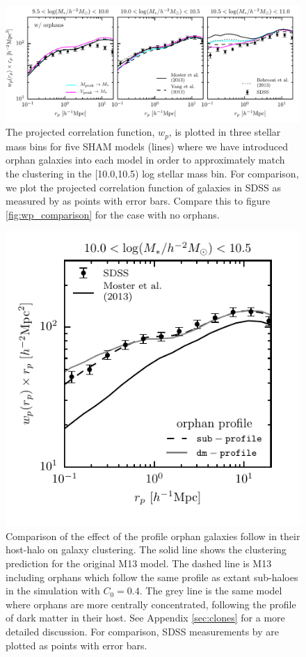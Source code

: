 \documentclass[a4paper,fleqn,usenatbib]{mnras}
\begin{document}
\begin{figure}
    \includegraphics{figures/wp_comparison_w_orphans.pdf}
    \caption{The projected correlation function, $w_p$, is plotted in three stellar mass bins for five SHAM models (lines) where we have introduced orphan galaxies into each model in order to approximately match the clustering in the [10.0,10.5) log stellar mass bin.  For comparison, we plot the projected correlation function of galaxies in SDSS as measured by \citet{Yang:2012ew} as points with error bars.  Compare this to figure \ref{fig:wp_comparison} for the case with no orphans.  }
    \label{fig:wp_comparison_w_orphans}
\end{figure}

\begin{figure}
    \includegraphics{figures/wp_comparison_clone_profile_2.pdf}
    \caption{Comparison of the effect of the profile orphan galaxies follow in their host-halo on galaxy clustering.  The solid line shows the clustering prediction for the original M13 model.  The dashed line is M13 including orphans which follow the same profile as extant sub-haloes in the simulation with $C_0=0.4$.  The grey line is the same model where orphans are more centrally concentrated, following the profile of dark matter in their host.  See Appendix \ref{sec:clones} for a more detailed discussion.  For comparison, SDSS measurements by \citet{Yang:2012ew} are plotted as points with error bars.}
    \label{fig:orphan_clustering_2}
\end{figure}
\end{document}
